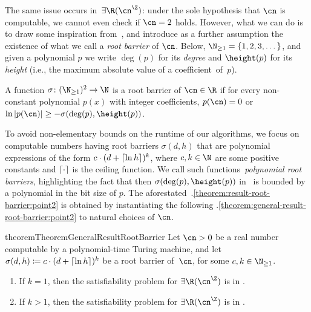 The same issue occurs in~$\exists\R(\ipow{\cn})$: under the sole hypothesis that
$\cn$ is computable, we cannot even check if $\cn = 2$ holds. However, what we
can do is to draw some inspiration from~, and introduce as
a further assumption the existence of what we call a \emph{root barrier} of
$\cn$. Below, $\N_{\geq 1} = \{1,2,3,\dots\}$, and given a polynomial $p$ we
write $\deg(p)$ for its \emph{degree} and $\height(p)$ for its \emph{height}
(i.e., the maximum absolute value of a coefficient~of~$p$).

\begin{definition}
  \label{definition:intro:root-barrier}
  A function $\sigma \colon (\N_{\geq 1})^2 \to \N$ is a root barrier of $\cn
  \in \R$ if for every non-constant polynomial $p(x)$ with integer coefficients, $p(\cn) =
  0$ or $\ln \abs{p(\cn)} \geq {-\sigma(\deg(p), \height(p))}$.
\end{definition}

To avoid non-elementary bounds on the runtime of our algorithms, we focus on
computable numbers having root barriers $\sigma(d,h)$ that are polynomial
expressions of the form ${c \cdot (d + \left\lceil\ln h\right\rceil)^k}$, where $c,k \in \N$
are some positive constants and $\left\lceil\cdot\right\rceil$ is the ceiling function. We call such
functions~\emph{polynomial root barriers},  
highlighting the fact that then $\sigma(\deg(p),\height(p))$
in~ is bounded by a polynomial in the bit
size of $p$. The
aforestated~.\ref{theorem:result-root-barrier:point2} is obtained by instantiating the following .\ref{theorem:general-result-root-barrier:point2} to natural choices of $\cn$.

\begin{restatable}{theorem}{TheoremGeneralResultRootBarrier}
  \label{theorem:general-result-root-barrier}
    Let $\cn > 0$ be a real number computable by a polynomial-time Turing machine, 
    and let~$\sigma(d,h) \coloneqq {c
    \cdot (d + \ensuremath{\left\lceil\ln h\right\rceil})^k}$ be a root barrier of~$\cn$, 
    for some $c,k \in \N_{\geq 1}$.
    \begin{enumerate}
      \item\label{theorem:general-result-root-barrier:point1} If $k = 1$, then
      the satisfiability problem for $\exists\R(\ipow{\cn})$ is in \twoexptime.
      \item\label{theorem:general-result-root-barrier:point2} If $k > 1$, then
      the satisfiability problem for $\exists\R(\ipow{\cn})$ is in
      \threeexptime.
    \end{enumerate}

\end{restatable}


